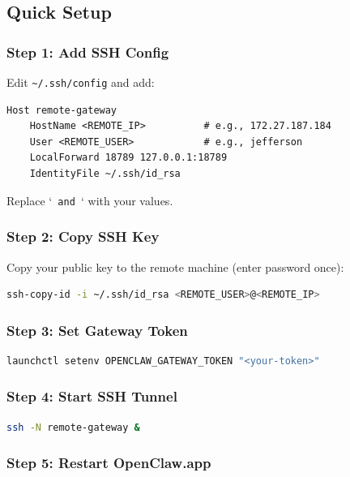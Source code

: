 \subsection{Quick Setup}


\subsubsection{Step 1: Add SSH Config}


Edit \texttt{\textasciitilde{}/.ssh/config} and add:

\begin{lstlisting}
Host remote-gateway
    HostName <REMOTE_IP>          # e.g., 172.27.187.184
    User <REMOTE_USER>            # e.g., jefferson
    LocalForward 18789 127.0.0.1:18789
    IdentityFile ~/.ssh/id_rsa
\end{lstlisting}


Replace `\texttt{ and }` with your values.

\subsubsection{Step 2: Copy SSH Key}


Copy your public key to the remote machine (enter password once):

\begin{lstlisting}[language=bash]
ssh-copy-id -i ~/.ssh/id_rsa <REMOTE_USER>@<REMOTE_IP>
\end{lstlisting}


\subsubsection{Step 3: Set Gateway Token}


\begin{lstlisting}[language=bash]
launchctl setenv OPENCLAW_GATEWAY_TOKEN "<your-token>"
\end{lstlisting}


\subsubsection{Step 4: Start SSH Tunnel}


\begin{lstlisting}[language=bash]
ssh -N remote-gateway &
\end{lstlisting}


\subsubsection{Step 5: Restart OpenClaw.app}


